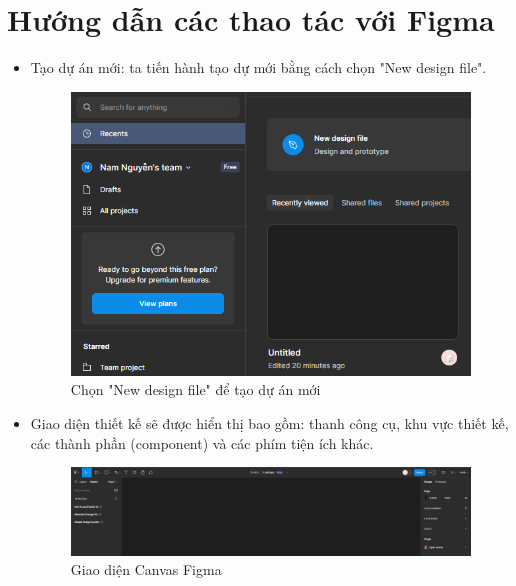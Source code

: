 \documentclass[11pt]{article}
\begin{document}
\section{Hướng dẫn các thao tác với Figma}

\begin{itemize}
    \item Tạo dự án mới: ta tiến hành tạo dự mới bằng cách chọn "New design file".
          \begin{figure}[!h]
              \centering
              \includegraphics[width=1\linewidth]{imgs/img (1).png}
              \caption{Chọn "New design file" để tạo dự án mới}
          \end{figure}
          \newpage
    \item Giao diện thiết kế sẽ được hiển thị bao gồm: thanh công cụ, khu vực thiết kế, các thành phần (component) và các phím tiện ích khác.

          \begin{figure}[!h]
              \centering
              \includegraphics[width=1\linewidth]{imgs/img (2).png}
              \caption{Giao diện Canvas Figma}
          \end{figure}
        



\end{itemize}
\end{document}

